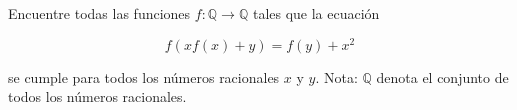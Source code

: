 Encuentre todas las funciones $f : \mathbb{Q} \to \mathbb{Q}$ tales que la ecuación

\[f(xf(x)+y) = f(y) + x^2\]

se cumple para todos los números racionales $x$ y $y$.
Nota: $\mathbb{Q}$ denota el conjunto de todos los números racionales.